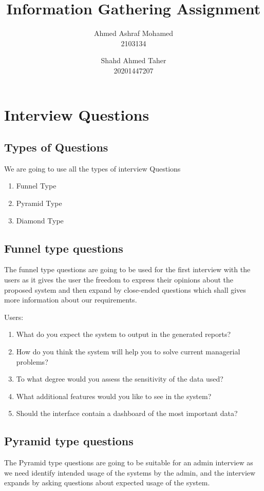 \documentclass{article}
\title{Information Gathering Assignment}
\author{Ahmed Ashraf Mohamed\\2103134 \and Shahd Ahmed Taher\\20201447207}
\date{}
\begin{document}
\maketitle
\tableofcontents
\section{Interview Questions}
\subsection{Types of Questions}
We are going to use all the types of interview Questions
\begin{enumerate}
    \item Funnel Type
    \item Pyramid Type
    \item Diamond Type
\end{enumerate}
\subsection{Funnel type questions}
The funnel type questions are going to be used for the first interview with the users as it gives the user the freedom to express their opinions about the proposed system and then expand by close-ended questions which shall gives more
information about our requirements.

Users:
\begin{enumerate}
    \item What do you expect the system to output in the generated reports?
    \item How do you think the system will help you to solve current managerial problems?
    \item To what degree would you assess the sensitivity of the data used?
    \item What additional features would you like to see in the system?
    \item Should the interface contain a dashboard of the most important data?
\end{enumerate}
\subsection{Pyramid type questions}
The Pyramid type questions are going to be suitable for an admin interview as we need identify intended usage of the systems by the admin, and the interview expands by asking questions about  expected usage of the system.
\end{document}
